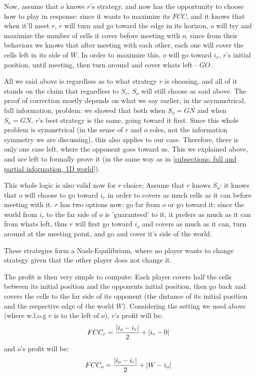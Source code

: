 \documentclass[a4paper,10pt]{article}
\newcommand\rob{\ensuremath{r}\xspace}
\newcommand\opp{\ensuremath{o}\xspace}
\newcommand{\w}{\ensuremath{W}\xspace}
\newcommand{\fcc}{\ensuremath{FCC}\xspace}
\newcommand{\gn}{\ensuremath{GN}\xspace}
\newcommand{\go}{\ensuremath{GO}\xspace}
\DeclarePairedDelimiter\abs{\lvert}{\rvert}%
\begin{document}
Now, assume that \opp knows \rob's strategy, and now has the opportunity to choose how to play in response: since it wants to maximize its \fcc, and it knows that when it'll meet \rob, \rob will turn and go toward the edge in its horizon, \opp will try and maximize the number of cells it cover before meeting with \opp, since from their behaviors we knows that after meeting with each other, each one will cover the cells left in its side of \w. In order to maximize this, \opp will go toward $i_{\rob}$, \rob's initial position, until meeting, then turn around and cover whats left - \go.

All we said above is regardless as to what strategy \rob is choosing, and all of it stands on the claim that regardless to $S_{\rob}$, $S_{\opp}$ will still choose as said above. The proof of correction mostly depends on what we say earlier, in the asymmetrical, full information, problem: we showed that both when $S_{\opp}=\gn$ and when $S_{\opp}=\gn$, \rob's best strategy is the same, going toward it first. Since this whole problem is symmetrical (in the sense of \rob and \opp roles, not the information symmetry we are discussing), this also applies to our case.
Therefore, there is only one case left, where the opponent goes toward us. This we explained above, and are left to formally prove it (in the same way as in \ref{subsections: full and partial information, 1D world}).


This whole logic is also valid now for \rob choice; Assume that \rob knows $S_{\opp}$: it knows that \opp will choose to  go toward $i_{\rob}$ in order to covers as much cells as it can before meeting with it. \rob has two options now: go far from \opp or go toward it: since the world from $i_{\rob}$ to the far side of \opp is 'guaranteed' to it, it prefers as much as it can from whats left, thus \rob will first go toward $i_{\opp}$ and covers as much as it can, turn around at the meeting point, and go and cover it's side of the world.

These strategies form a Nash-Equilibrium, where no player wants to change strategy given that the other player does not change it.

The profit is then very simple to compute:
Each player covers half the cells between its initial position and the opponents initial position, then go back and covers the cells to the far side of its opponent (the distance of its initial position and the respective edge of the world \w).
Considering the setting we used above (where w.l.o.g \rob is to the  left of \opp), \rob's profit will be:\[\fcc_r=\frac{\abs*{i_{\opp} - i_{\rob}}}{2}+\abs*{i_{\rob}-0}\] and \opp's profit will be: \[\fcc_{\opp}=\frac{\abs*{i_{\opp} - i_{\rob}}}{2}+\abs*{\w - i_{\opp}}\]
\end{document}
